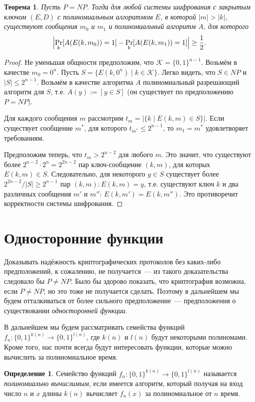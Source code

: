 \documentclass[12pt,a4paper]{article}
\newcommand{\bits}{\{0,1\}}
\theoremstyle{definition}
\newtheorem{definition}{Определение}[section]
\theoremstyle{plain}
\newtheorem{theorem}{Теорема}[section]
\theoremstyle{remark}
\begin{document}
\begin{theorem}
Пусть $P=NP$. Тогда для любой системы шифрования с закрытым ключом $(E,D)$ 
с полиномиальным алгоритмом $E$, в которой $|m|>|k|$, существуют сообщения 
$m_0$ и $m_1$ и полиномиальный алгоритм $A$, для которого
$$\Bigl|\Pr_k[A(E(k,m_0)) = 1]-\Pr_k[A(E(k,m_1)) = 1]\Bigr|\ge\frac12.$$
\end{theorem}
\begin{proof}
Не уменьшая общности предположим, что $\mathcal K = \bits^{n-1}$. 
Возьмём в качестве $m_0 = 0^n$. 
Пусть $S = \{E(k, 0^n)\mid k\in\mathcal K\}$. Легко видеть, что $S\in NP$ и $|S|\le 2^{n-1}$. Возьмём в качестве алгоритма $A$ полиномиальный разрешающий алгоритм для $S$, т.е. $A(y) := [y\in S]$ (он существует по предположению $P=NP$).

Для каждого сообщения $m$ рассмотрим $t_m = \bigl|\{k\mid E(k, m) \in S\}\bigr|$. 
Если существует сообщение $m^*$, для которого $t_{m^*} \le 2^{n-1}$, то $m_1 = m^*$ удовлетворяет требованиям. 

Предположим теперь, что $t_m > 2^{n-2}$ для любого $m$. Это значит, что существуют более $2^{n-2}\cdot 2^n = 2^{2n - 2}$ пар ключ-сообщение $(k,m)$, для которых 
$E(k,m)\in S$. Следовательно, для некоторого $y\in S$ существует более $2^{2n - 2} / |S| \ge 2^{n-1}$ пар $(k,m): E(k,m) = y$, т.е. существуют ключ $k$ и два различных сообщения $m'$ и $m''$: $E(k,m') = E(k,m'')$. Это противоречит корректности системы шифрования.
\end{proof}

\section{Односторонние функции}
Доказывать надёжность криптографических протоколов без каких-либо предположений, к сожалению, не получается~--- из такого доказательства следовало бы $P\neq NP$.
Было бы здорово показать, что криптография возможна, если $P\neq NP$, но это тоже не получается сделать. Поэтому в дальнейшем мы
будем отталкиваться от более сильного предположение~--- предположения о существовании \emph{односторонней функции}.

В дальнейшем мы будем рассматривать семейства функций $f_n: \bits^{k(n)} \to \bits^{l(n)}$, где $k(n)$ и $l(n)$ будут некоторыми полиномами. Кроме того, нас почти всегда будут интересовать
функции, которые можно вычислить за полиномиальное время.

\begin{definition}
    Семейство функций $f_n: \bits^{k(n)} \to \bits^{l(n)}$ называется 
    \emph{полиномиально вычислимым}, если имеется алгоритм, который получая на вход 
    число $n$ и $x$ длины $k(n)$ вычисляет $f_n(x)$ за полиномиальное от $n$ время.
\end{definition}
\end{document}

